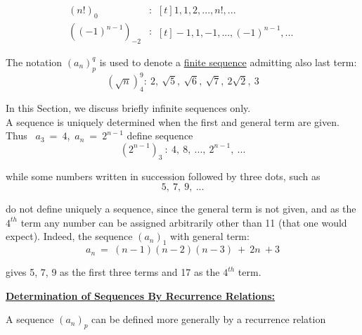 \documentclass[11pt]{amsbook}
\begin{document}


\begin{align*}
    {(n!)_{0}} &:
    \begin{aligned}[t]
        1, 1, 2, ... , n!, ...
    \end{aligned}\\
    ((-1)^{n-1})_{-2} &: 
    \begin{aligned}[t]
        -1, 1, -1, ... , (-1)^{n-1}, ...
    \end{aligned}
\end{align*}

\indent The notation $(a_n)^q_p$ is used to denote a \underline{finite sequence} admitting
also last term:
\begin{equation*}
    (\sqrt{n})^9_4 : \ 2,\ \sqrt{5},\ \sqrt{6},\ \sqrt{7},\ 2\sqrt{2},\ 3
\end{equation*}

\indent In this Section, we discuss briefly infinite sequences only.\\
\indent A sequence is uniquely determined when the first and general term are given. Thus
\ $a_3\ =\ 4$,\ $a_n\ =\ 2^{n-1}$ define sequence
\begin{equation*}
    (2^{n-1})_3\ :\ 4,\ 8,\ ...,\ 2^{n-1},\ ...
\end{equation*}

\noindent while some numbers written in succession followed by three dots, such as
\begin{equation*}
    5,\ 7,\ 9,\ ...
\end{equation*}

\noindent do not define uniquely a sequence, since the general term is not given, and as the 
$4^{th}$ term any number can be assigned arbitrarily other than 11 (that one would expect).
Indeed, the sequence $(a_n)_1$ with general term:
\begin{equation*}
    a_n\ =\ (n-1)(n-2)(n-3)\ +\ 2n\ + 3
\end{equation*}

\noindent gives 5, 7, 9 as the first three terms and 17 as the $4^{th}$ term.
\par
\underline{\textbf{Determination of Sequences By Recurrence Relations:}}\\

\par
A sequence $(a_{n})_{p}$ can be defined more generally by a recurrence relation\\
\end{document}

